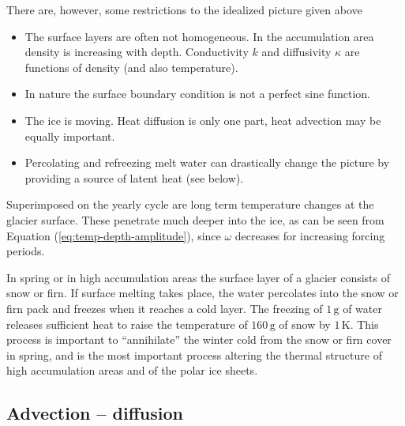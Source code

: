 \documentclass[parskip=half]{scrartcl}
\newcommand{\unit}[1]{\ensuremath{\,\mathrm{#1}}}
\begin{document}
There are, however, some restrictions to the idealized picture given
above
%
\begin{itemize}
\item The surface layers are often not homogeneous.  In the
accumulation area density is increasing with depth. Conductivity $k$
and diffusivity $\kappa$ are functions of density (and also
temperature).
\item In nature the surface boundary condition is not a perfect sine
function.
\item The ice is moving.  Heat diffusion is only one part, heat
advection may be equally important.
\item Percolating and refreezing melt water can drastically change the
picture by providing a source of latent heat (see below).
\end{itemize}
%
Superimposed on the yearly cycle are long term temperature changes at
the glacier surface.  These penetrate much deeper into the ice, as can
be seen from Equation (\ref{eq:temp-depth-amplitude}), since $\omega$
decreases for increasing forcing periods.

In spring or in high accumulation areas the surface layer of a glacier
consists of snow or firn.  If surface melting takes place, the water
percolates into the snow or firn pack and freezes when it reaches a
cold layer.  The freezing of $1\unit{g}$ of water releases sufficient
heat to raise the temperature of $160\unit{g}$ of snow by $1\unit{K}$.
This process is important to ``annihilate'' the winter cold from the
snow or firn cover in spring, and is the most important process
altering the thermal structure of high accumulation areas and of the
polar ice sheets.

\subsection{Advection -- diffusion}
\label{sec:advection-diffusion}
\end{document}
